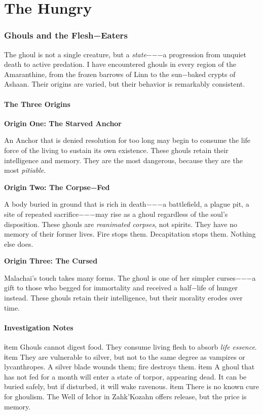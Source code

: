 \part{The Hungry}

\section{Ghouls and the Flesh−Eaters}

The ghoul is not a single creature, but a \emph{state}−−−a progression from unquiet death to active predation. I have encountered ghouls in every region of the Amaranthine, from the frozen barrows of Linn to the sun−baked crypts of Ashaan. Their origins are varied, but their behavior is remarkably consistent.

\subsection{The Three Origins}

\textbf{Origin One: The Starved Anchor}

An Anchor that is denied resolution for too long may begin to consume the life force of the living to sustain its own existence. These ghouls retain their intelligence and memory. They are the most dangerous, because they are the most \emph{pitiable}.

\textbf{Origin Two: The Corpse−Fed}

A body buried in ground that is rich in death−−−a battlefield, a plague pit, a site of repeated sacrifice−−−may rise as a ghoul regardless of the soul's disposition. These ghouls are \emph{reanimated corpses}, not spirits. They have no memory of their former lives. Fire stops them. Decapitation stops them. Nothing else does.

\textbf{Origin Three: The Cursed}

Malachai's touch takes many forms. The ghoul is one of her simpler curses−−−a gift to those who begged for immortality and received a half−life of hunger instead. These ghouls retain their intelligence, but their morality erodes over time.

\subsection{Investigation Notes}

\begin{itemize}
  ℹtem Ghouls cannot digest food. They consume living flesh to absorb \emph{life essence}.
  ℹtem They are vulnerable to silver, but not to the same degree as vampires or lycanthropes. A silver blade wounds them; fire destroys them.
  ℹtem A ghoul that has not fed for a month will enter a state of torpor, appearing dead. It can be buried safely, but if disturbed, it will wake ravenous.
  ℹtem There is no known cure for ghoulism. The Well of Ichor in Zahk'Kozahn offers release, but the price is memory.
\end{itemize}

